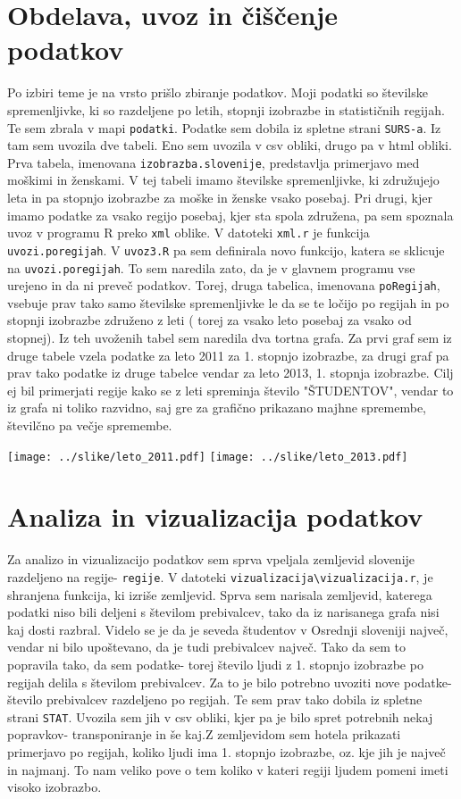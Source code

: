 \documentclass[11pt,a4paper]{article}
\begin{document}
\section{Obdelava, uvoz in čiščenje podatkov}
Po izbiri teme je na vrsto prišlo zbiranje podatkov. Moji podatki so številske spremenljivke, ki so razdeljene po letih, stopnji izobrazbe in statističnih regijah. Te sem zbrala v mapi \verb|podatki|. Podatke sem dobila iz spletne strani \verb|SURS-a|. Iz tam sem uvozila dve tabeli. Eno sem uvozila v csv obliki, drugo pa v html obliki. Prva tabela, imenovana \verb|izobrazba.slovenije|, predstavlja primerjavo med moškimi in ženskami. V tej tabeli imamo številske spremenljivke, ki združujejo leta in pa stopnjo izobrazbe za moške in ženske vsako posebaj. Pri drugi, kjer imamo podatke za vsako regijo posebaj, kjer sta spola združena, pa sem spoznala uvoz v programu R preko \verb|xml| oblike. V datoteki \verb|xml.r| je funkcija \verb|uvozi.poregijah|. V \verb|uvoz3.R| pa sem definirala novo funkcijo, katera se sklicuje na \verb|uvozi.poregijah|. To sem naredila zato, da je v glavnem programu vse urejeno in da ni preveč podatkov. Torej, druga tabelica, imenovana \verb|poRegijah|, vsebuje prav tako samo številske spremenljivke le da se te ločijo po regijah in po stopnji izobrazbe združeno z leti ( torej za vsako leto posebaj za vsako od stopnej). Iz teh uvoženih tabel sem naredila dva tortna grafa. Za prvi graf sem iz druge tabele vzela podatke za leto 2011 za 1. stopnjo izobrazbe, za drugi graf pa prav tako podatke iz druge tabelce vendar za leto 2013, 1. stopnja izobrazbe. Cilj ej bil primerjati regije kako se z leti spreminja število "ŠTUDENTOV", vendar to iz grafa ni toliko razvidno, saj gre za grafično prikazano majhne spremembe, številčno pa večje spremembe.

\texttt{[image: ../slike/leto\_2011.pdf]}
\texttt{[image: ../slike/leto\_2013.pdf]}

\pagebreak

\section{Analiza in vizualizacija podatkov}
Za analizo in vizualizacijo podatkov sem sprva vpeljala zemljevid slovenije razdeljeno na regije- \verb|regije|.  V datoteki \verb|vizualizacija\vizualizacija.r|, je shranjena funkcija, ki izriše zemljevid. Sprva sem narisala zemljevid, katerega podatki niso bili deljeni s številom prebivalcev, tako da iz narisanega grafa nisi kaj dosti razbral. Videlo se je da je seveda študentov v Osrednji sloveniji največ, vendar ni bilo upoštevano, da je tudi prebivalcev največ. Tako da sem to popravila tako, da sem podatke- torej število ljudi z 1. stopnjo izobrazbe po regijah delila s številom prebivalcev. Za to je bilo potrebno uvoziti nove podatke-število prebivalcev razdeljeno po regijah. Te sem prav tako dobila iz spletne strani \verb|STAT|. Uvozila sem jih v csv obliki, kjer pa je bilo spret potrebnih nekaj popravkov- transponiranje in še kaj.Z zemljevidom sem hotela prikazati primerjavo po regijah, koliko ljudi ima 1. stopnjo izobrazbe, oz. kje jih je največ in najmanj. To nam veliko pove o tem koliko v kateri regiji ljudem pomeni imeti visoko izobrazbo.
\end{document}
